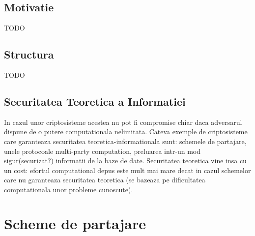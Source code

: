 \documentclass{llncs}
\begin{document}
\subsection{Motivatie}
TODO

\subsection{Structura}
TODO


\subsection{Securitatea Teoretica a Informatiei}

In cazul unor criptosisteme acestea nu pot fi compromise chiar daca adversarul dispune de o putere computationala nelimitata. Cateva exemple de criptosisteme care garanteaza securitatea teoretica-informationala sunt: schemele de partajare, unele protocoale multi-party computation, preluarea intr-un mod sigur(securizat?) informatii de la baze de date. Securitatea teoretica vine insa cu un cost: efortul computational depus este mult mai mare decat in cazul schemelor care nu garanteaza securitatea teoretica (se bazeaza pe dificultatea computationala unor probleme cunoscute). \cite{L:1997}

\section{Scheme de partajare}
\label{sec:encryption}
\end{document}
